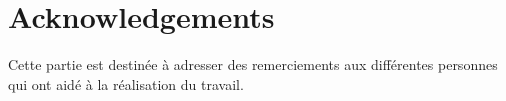 \chapter*{Acknowledgements}

\noindent Cette partie est destinée à adresser des remerciements aux
différentes personnes qui ont aidé à la réalisation du travail.